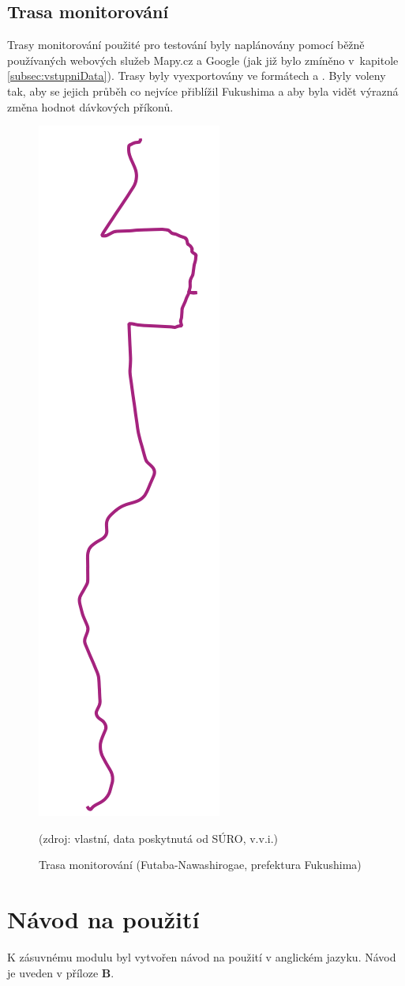 \subsection{Trasa monitorování} Trasy monitorování použité pro
testování byly naplánovány pomocí běžně používaných webových služeb
Mapy.cz a Google (jak již bylo zmíněno v~kapitole
\ref{subsec:vstupniData}). Trasy byly vyexportovány ve formátech
 a . Byly voleny tak, aby se jejich průběh co nejvíce
přiblížil  Fukushima a aby byla vidět výrazná změna hodnot
dávkových příkonů.
\newpage
\begin{figure}[H] \centering
    \includegraphics[scale=0.3]{./pictures/trasa_monitorovani.png}
      	\caption[Trasa monitorování (Futaba-Nawashirogae, prefektura
Fukushima)]{Trasa monitorování (Futaba-Nawashirogae, prefektura
Fukushima)}(zdroj: vlastní, data poskytnutá od SÚRO, v.v.i.)
    	\label{fig:interpolatedMap}
\end{figure}



\section{Návod na použití}
K zásuvnému modulu byl vytvořen návod na použití v anglickém jazyku. 
Návod je uveden v příloze \textbf{B}. 